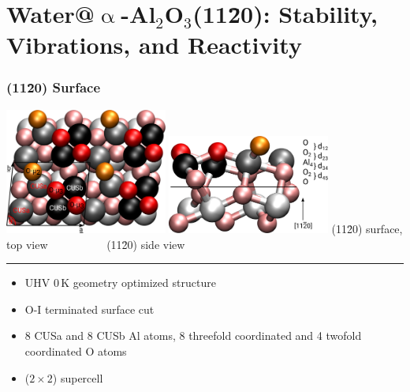 \documentclass[hyperref={pdfpagelabels=false}]{beamer}
\begin{document}
\section{Water@$\upalpha$-Al$_2$O$_3$(11\=20): Stability, Vibrations, and Reactivity}
\begin{frame}
 \frametitle{(11\=20) Surface}
\includegraphics[width=0.4\textwidth]{figures/supercell_opt.png}
\includegraphics[width=0.4\textwidth]{figures/uc_opt.png}
(11\=20) surface, top view  ~ ~ ~~~~~~ (11\=20) side view
\newline
 \hrule
 \begin{itemize}
  \item UHV $0\,$K geometry optimized structure
  \item O-I terminated surface cut
  \item 8 CUSa and 8 CUSb Al atoms, 8 threefold coordinated and 4 twofold coordinated O atoms
  \item ($2\times 2$) supercell
 \end{itemize}
 \end{frame}
\end{document}
